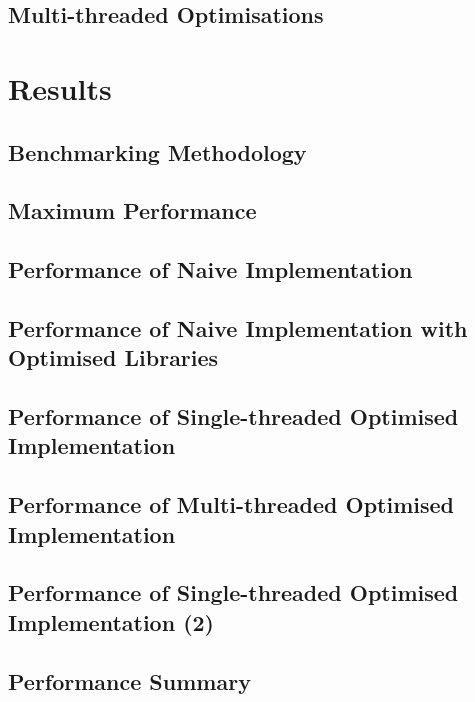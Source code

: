 \documentclass{acm_proc_article-sp}
\begin{document}
\subsection{Multi-threaded Optimisations}


\section{Results\label{sec:results}}

\subsection{Benchmarking Methodology}

\subsection{Maximum Performance}

\subsection{Performance of Naive Implementation}

\subsection{Performance of Naive Implementation with Optimised Libraries}

\subsection{Performance of Single-threaded Optimised Implementation}

\subsection{Performance of Multi-threaded Optimised Implementation}

\subsection{Performance of Single-threaded Optimised Implementation (2)}

\subsection{Performance Summary}
\end{document}
